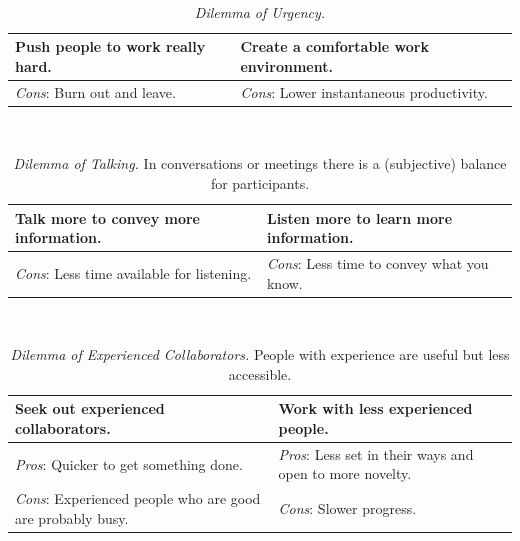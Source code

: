 \ \\

\begin{center}
\begin{table}[H] %
\begin{tabular}{ | m{\dilemmatablewidth}| m{\dilemmatablewidth} | } 
  \hline
  \textbf{Push people to work really hard.} & 
  \textbf{Create a comfortable work environment.} \\ 
  \hline
  \textit{Cons}: Burn out and leave. & 
  \textit{Cons}: Lower instantaneous productivity. \\  
  \hline
\end{tabular}
\caption{\textit{Dilemma of Urgency.}
}
\label{table:rate-of-work}
\end{table}
\end{center}

\ \\

\begin{center}
\begin{table}[H] %
\begin{tabular}{ | m{\dilemmatablewidth}| m{\dilemmatablewidth} | } 
  \hline
  \textbf{Talk more to convey more information.} & 
  \textbf{Listen more to learn more information.} \\ 
  \hline
  \textit{Cons}: Less time available for listening. & 
  \textit{Cons}: Less time to convey what you know. \\  
  \hline
\end{tabular}
\caption{\textit{Dilemma of Talking.}
In conversations or meetings there is a (subjective) balance for participants.
}
\label{table:talk-or-listen}
\end{table}
\end{center}

\ \\


\begin{center}
\begin{table}[H] %
\begin{tabular}{ | m{\dilemmatablewidth}| m{\dilemmatablewidth} | } 
  \hline
  \textbf{Seek out experienced collaborators.} & 
  \textbf{Work with less experienced people.} \\ 
  \hline
  \textit{Pros}: Quicker to get something done. &
  \textit{Pros}: Less set in their ways and open to more novelty. \\  
  \hline
  \textit{Cons}: Experienced people who are good are probably busy. &
  \textit{Cons}: Slower progress. \\  
  \hline
\end{tabular}
\caption{\textit{Dilemma of Experienced Collaborators.}
People with experience are useful but less accessible.
}
\label{table:experience}
\end{table}
\end{center}


